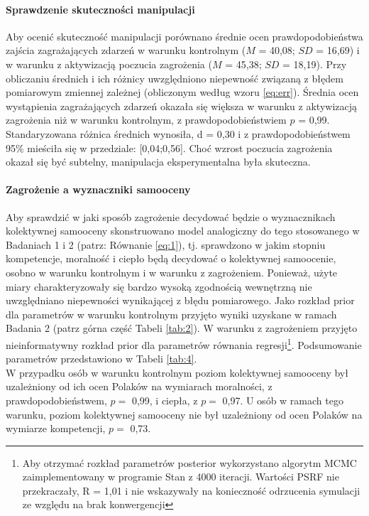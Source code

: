 \documentclass[man]{apa6}
\begin{document}
\paragraph{Sprawdzenie skuteczności manipulacji}
Aby ocenić skuteczność manipulacji porównano średnie ocen prawdopodobieństwa zajścia zagrażających zdarzeń w warunku kontrolnym ($M$ = 40,08; $SD$ = 16,69) i w warunku z aktywizacją poczucia zagrożenia ($M$ = 45,38; $SD$ = 18,19). Przy obliczaniu średnich i ich różnicy uwzględniono niepewność związaną z błędem pomiarowym zmiennej zależnej (obliczonym według wzoru \ref{eq:err}). Średnia ocen wystąpienia zagrażających zdarzeń okazała się większa w warunku z aktywizacją zagrożenia niż w warunku kontrolnym, z prawdopodobieństwiem $p$ = 0,99. Standaryzowana różnica średnich wynosiła, d = 0,30 i z prawdopodobieństwem 95\% mieściła się w przedziale: [0,04;0,56]. Choć wzrost poczucia zagrożenia okazał się być subtelny, manipulacja eksperymentalna była skuteczna.

\paragraph{Zagrożenie a wyznaczniki samooceny}
Aby sprawdzić w jaki sposób zagrożenie decydować będzie o wyznacznikach kolektywnej samooceny skonstruowano model analogiczny do tego stosowanego w Badaniach 1 i 2 (patrz: Równanie \ref{eq:1}), tj. sprawdzono w jakim stopniu kompetencje, moralność i ciepło będą decydować o kolektywnej samoocenie, osobno w warunku kontrolnym i w warunku z zagrożeniem. Ponieważ, użyte miary charakteryzowały się bardzo wysoką zgodnością wewnętrzną nie uwzględniano niepewności wynikającej z błędu pomiarowego. Jako rozkład prior dla parametrów w warunku kontrolnym przyjęto wyniki uzyskane w ramach Badania 2 (patrz górna część Tabeli \ref{tab:2}). W warunku z zagrożeniem przyjęto nieinformatywny rozkład prior dla parametrów równania regresji\footnote{Aby otrzymać rozkład parametrów posterior wykorzystano algorytm MCMC zaimplementowany w programie Stan z 4000 iteracji. Wartości PSRF nie przekraczały, R = 1,01 i nie wskazywały na konieczność odrzucenia symulacji ze względu na brak konwergencji}. Podsumowanie parametrów przedstawiono w Tabeli \ref{tab:4}. \\

W przypadku osób w warunku kontrolnym poziom kolektywnej samooceny był uzależniony od ich ocen Polaków na wymiarach moralności, z prawdopodobieństwem, $p =$ 0,99, i ciepła, z $p =$ 0,97. U osób w ramach tego warunku, poziom kolektywnej samooceny nie był uzależniony od ocen Polaków na wymiarze kompetencji, $p =$ 0,73. \\
\end{document}
